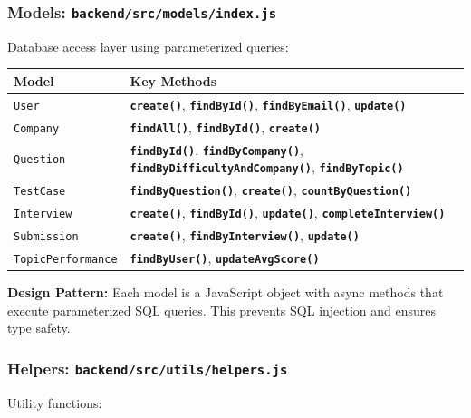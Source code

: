 \documentclass[12pt,a4paper,oneside]{article}
\newcommand{\fileref}[1]{\texttt{#1}}
\newcommand{\funcname}[1]{\texttt{\textbf{#1}}}
\begin{document}
\subsubsection{Models: \fileref{backend/src/models/index.js}}

Database access layer using parameterized queries:

\begin{table}[H]
\centering
\small
\begin{tabular}{|p{2.5cm}|p{11cm}|}
\hline
\textbf{Model} & \textbf{Key Methods} \\
\hline
\texttt{User} & \funcname{create()}, \funcname{findById()}, \funcname{findByEmail()}, \funcname{update()} \\
\hline
\texttt{Company} & \funcname{findAll()}, \funcname{findById()}, \funcname{create()} \\
\hline
\texttt{Question} & \funcname{findById()}, \funcname{findByCompany()}, \funcname{findByDifficultyAndCompany()}, \funcname{findByTopic()} \\
\hline
\texttt{TestCase} & \funcname{findByQuestion()}, \funcname{create()}, \funcname{countByQuestion()} \\
\hline
\texttt{Interview} & \funcname{create()}, \funcname{findById()}, \funcname{update()}, \funcname{completeInterview()} \\
\hline
\texttt{Submission} & \funcname{create()}, \funcname{findByInterview()}, \funcname{update()} \\
\hline
\texttt{TopicPerformance} & \funcname{findByUser()}, \funcname{updateAvgScore()} \\
\hline
\end{tabular}
\end{table}

\textbf{Design Pattern:} Each model is a JavaScript object with async methods that execute parameterized SQL queries. This prevents SQL injection and ensures type safety.

\subsubsection{Helpers: \fileref{backend/src/utils/helpers.js}}

Utility functions:
\end{document}
